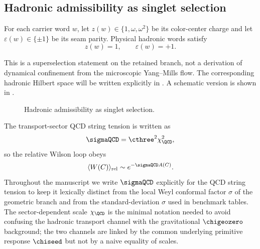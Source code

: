 
\subsection{Hadronic admissibility as singlet selection}

\begin{proposition}
For each carrier word $w$, let $z(w)\in\{1,\omega,\omega^2\}$ be its color-center charge and let $\varepsilon(w)\in\{\pm1\}$ be its seam parity. Physical hadronic words satisfy
\[
z(w)=1,
\qquad
\varepsilon(w)=+1.
\]
\end{proposition}

This is a superselection statement on the retained branch, not a derivation of dynamical confinement from the microscopic Yang--Mills flow. The corresponding hadronic Hilbert space will be written explicitly in . A schematic version is shown in .

\begin{figure}[t]
\centering
{}
\caption{Hadronic admissibility as singlet selection.}
\label{fig:admissible-words}
\end{figure}

The transport-sector QCD string tension is written as
\[
\sigmaQCD=\cthree^2\chi_{\QCD}^2,
\]
so the relative Wilson loop obeys
\[
\langle W(C)\rangle_{\mathrm{rel}}\sim e^{-\sigmaQCD A(C)}.
\]
Throughout the manuscript we write $\sigmaQCD$ explicitly for the QCD string tension to keep
it lexically distinct from the local Weyl conformal factor $\sigma$ of the geometric branch and
from the standard-deviation $\sigma$ used in benchmark tables. The sector-dependent scale
$\chi_{\QCD}$ is the minimal notation needed to avoid confusing the hadronic transport channel
with the gravitational $\chigeozero$ background; the two channels are linked by the common
underlying primitive response $\chiseed$ but not by a naive equality of scales.

